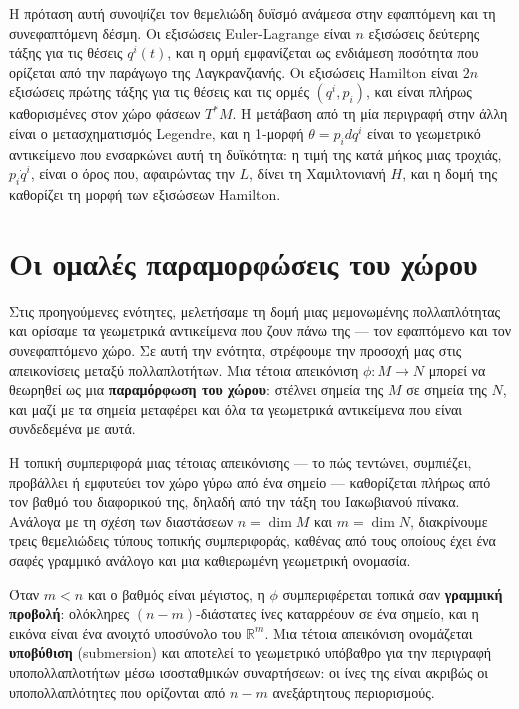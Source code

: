 \documentclass[11pt,a4paper,twoside,openright]{book}
\begin{document}
Η πρόταση αυτή συνοψίζει τον θεμελιώδη δυϊσμό ανάμεσα στην εφαπτόμενη και τη συνεφαπτόμενη δέσμη. Οι εξισώσεις Euler-Lagrange είναι $n$ εξισώσεις δεύτερης τάξης για τις θέσεις $q^i(t)$, και η ορμή εμφανίζεται ως ενδιάμεση ποσότητα που ορίζεται από την παράγωγο της Λαγκρανζιανής. Οι εξισώσεις Hamilton είναι $2n$ εξισώσεις πρώτης τάξης για τις θέσεις και τις ορμές $(q^i, p_i)$, και είναι πλήρως καθορισμένες στον χώρο φάσεων $T^*M$. Η μετάβαση από τη μία περιγραφή στην άλλη είναι ο μετασχηματισμός Legendre, και η 1-μορφή $\theta = p_i dq^i$ είναι το γεωμετρικό αντικείμενο που ενσαρκώνει αυτή τη δυϊκότητα: η τιμή της κατά μήκος μιας τροχιάς, $p_i \dot{q}^i$, είναι ο όρος που, αφαιρώντας την $L$, δίνει τη Χαμιλτονιανή $H$, και η δομή της καθορίζει τη μορφή των εξισώσεων Hamilton.

\section{Οι ομαλές παραμορφώσεις του χώρου}

Στις προηγούμενες ενότητες, μελετήσαμε τη δομή μιας μεμονωμένης πολλαπλότητας και ορίσαμε τα γεωμετρικά αντικείμενα που ζουν πάνω της --- τον εφαπτόμενο και τον συνεφαπτόμενο χώρο. Σε αυτή την ενότητα, στρέφουμε την προσοχή μας στις απεικονίσεις μεταξύ πολλαπλοτήτων. Μια τέτοια απεικόνιση $\phi: M \to N$ μπορεί να θεωρηθεί ως μια \textbf{παραμόρφωση του χώρου}: στέλνει σημεία της $M$ σε σημεία της $N$, και μαζί με τα σημεία μεταφέρει και όλα τα γεωμετρικά αντικείμενα που είναι συνδεδεμένα με αυτά.

Η τοπική συμπεριφορά μιας τέτοιας απεικόνισης --- το πώς τεντώνει, συμπιέζει, προβάλλει ή εμφυτεύει τον χώρο γύρω από ένα σημείο --- καθορίζεται πλήρως από τον βαθμό του διαφορικού της, δηλαδή από την τάξη του Ιακωβιανού πίνακα. Ανάλογα με τη σχέση των διαστάσεων $n = \dim M$ και $m = \dim N$, διακρίνουμε τρεις θεμελιώδεις τύπους τοπικής συμπεριφοράς, καθένας από τους οποίους έχει ένα σαφές γραμμικό ανάλογο και μια καθιερωμένη γεωμετρική ονομασία.

Όταν $m < n$ και ο βαθμός είναι μέγιστος, η $\phi$ συμπεριφέρεται τοπικά σαν \textbf{γραμμική προβολή}: ολόκληρες $(n-m)$-διάστατες ίνες καταρρέουν σε ένα σημείο, και η εικόνα είναι ένα ανοιχτό υποσύνολο του $\mathbb{R}^m$. Μια τέτοια απεικόνιση ονομάζεται \textbf{υποβύθιση} (submersion) και αποτελεί το γεωμετρικό υπόβαθρο για την περιγραφή υποπολλαπλοτήτων μέσω ισοσταθμικών συναρτήσεων: οι ίνες της είναι ακριβώς οι υποπολλαπλότητες που ορίζονται από $n-m$ ανεξάρτητους περιορισμούς.
\end{document}
